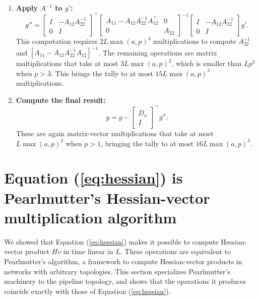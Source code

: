 \documentclass{article}
\begin{document}
\begin{enumerate}
    \item
          \textbf{Apply $A^{-1}$ to $g'$:}
          \[
              g'' =
              \begin{bmatrix}
                  I & -A_{12} A_{22}^{-1} \\ 0 & I
              \end{bmatrix}
              ^\top
              \begin{bmatrix}
                  A_{11} - A_{12} A_{22}^{-1} A_{12}^\top & 0      \\
                  0                                       & A_{22}
              \end{bmatrix}
              ^{-1}
              \begin{bmatrix}
                  I & -A_{12} A_{22}^{-1} \\ 0 & I
              \end{bmatrix}
              g'.
          \]
          This computation requires $2L\max(a,p)^3$ multiplications to compute $A_{22}^{-1}$ and $\left[A_{11}-A_{12}
                  A_{22}^{-1}A_{12}\right]^{-1}$. The remaining operations are matrix multiplications that take at most $3L\max(a,p)^2$,
          which is smaller than $Lp^3$ when $p>3$. This brings the tally to at most $15L\max(a,p)^3$ multiplications.

    \item
          \textbf{Compute the final result:}
          \[
              y = g - \begin{bmatrix}
                  D_x \\ I
              \end{bmatrix}
              ^\top g''.
          \]
          These are again matrix-vector multiplications that take at most $L\max(a,p)^2$ when $p>1$, bringing the tally to at
          most $16L\max(a,p)^3$.
\end{enumerate}




\appendix \section{Equation (\ref{eq:hessian}) is Pearlmutter's Hessian-vector multiplication algorithm}
\label{sec:pearlmutter}

We showed that Equation (\ref{eq:hessian}) makes it possible to compute Hessian-vector product $H v$ in time linear in
$L$. These operations are equivalent to Pearlmutter's \cite{pearlmutter94} algorithm, a framework to compute
Hessian-vector products in networks with arbitrary topologies. This section specializes Pearlmutter's machinery to the
pipeline topology, and shows that the operations it produces coincide exactly with those of Equation
(\ref{eq:hessian}).
\end{document}
